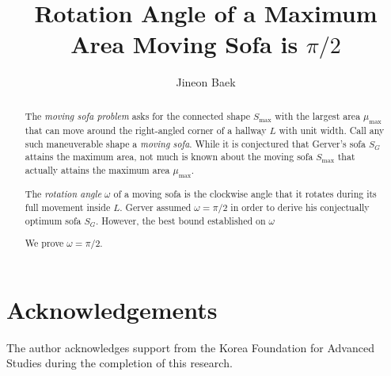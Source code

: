 \documentclass[10pt]{article}
\title{Rotation Angle of a Maximum Area Moving Sofa is $\pi/2$}
\author{Jineon Baek}
\theoremstyle{plain}
\theoremstyle{definition}
\theoremstyle{remark}
\begin{document}
\maketitle

\begin{abstract}
The \emph{moving sofa problem} asks for the connected shape $S_{\text{max}}$
with the largest area $\mu_{\text{max}}$
that can move around the right-angled corner of a hallway $L$ with unit width.
Call any such maneuverable shape a \emph{moving sofa}.
While it is conjectured that Gerver's sofa $S_G$ attains the maximum area,
not much is known about the moving sofa $S_{\max}$ that actually attains the
maximum area $\mu_{\max}$.

The \emph{rotation angle} $\omega$ of a moving sofa is the clockwise angle that it rotates
during its full movement inside $L$.
Gerver assumed $\omega = \pi/2$ in order to derive his conjectually optimum sofa $S_G$.
However, the best bound established on $\omega$ 

We prove $\omega = \pi/2$.
\end{abstract}

\tableofcontents



\section*{Acknowledgements}

The author acknowledges support from the Korea Foundation for Advanced Studies during the completion of this research.
\printbibliography
\end{document}
